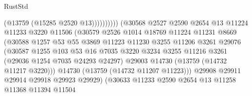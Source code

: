 \begin{lexlean}{RustStd}
\begin{coremodule}
                                              (@13759 (@15285 @2520 @13))))))))))
                              (@30568
                                @2527
                                @2590
                                @2654
                                @13
                                @11224
                                @11233
                                @3220
                                @11506
                                (@30579
                                  @2526
                                  @1014
                                  @18769
                                  @11224
                                  @11231
                                  @8669
                                  (@30588
                                    @1257
                                    @53
                                    @55
                                    @3869
                                    @11223
                                    @11230
                                    @3255
                                    @11206
                                    @3261
                                    @29076
                                    (@30587
                                      @1255
                                      @103
                                      @53
                                      @16
                                      @7035
                                      @3220
                                      @3234
                                      @3255
                                      @11216
                                      @3261
                                      (@29036 @1254 @7035 @24293 @24297)
                                      @29003
                                      @14730
                                      (@13759 (@14732 @11217 @3220)))
                                    @14730
                                    (@13759 (@14732 @11207 @11223)))
                                  @29908
                                  @29911
                                  @29914
                                  @29918
                                  @29923
                                  @29929)
                                (@30633
                                  @11233
                                  @2590
                                  @2654
                                  @13
                                  @11258
                                  @11368
                                  @11394
                                  @11504

\end{coremodule}
\end{lexlean}
